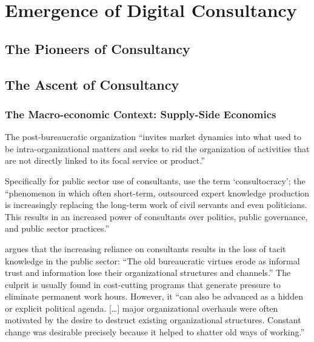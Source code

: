 \documentclass[12pt]{article}
\begin{document}
\hypertarget{emergence-of-digital-consultancy}{%
\section{Emergence of Digital
Consultancy}\label{emergence-of-digital-consultancy}}

\hypertarget{the-pioneers-of-consultancy}{%
\subsection{The Pioneers of
Consultancy}\label{the-pioneers-of-consultancy}}

\hypertarget{the-ascent-of-consultancy}{%
\subsection{The Ascent of Consultancy}\label{the-ascent-of-consultancy}}

\hypertarget{the-macro-economic-context-supply-side-economics}{%
\subsubsection{The Macro-economic Context: Supply-Side
Economics}\label{the-macro-economic-context-supply-side-economics}}

The post-bureaucratic organization ``invites market dynamics into what
used to be intra-organizational matters and seeks to rid the
organization of activities that are not directly linked to its focal
service or product.'' \citep[ 3]{furusten2000}

Specifically for public sector use of consultants,
\citet[242]{ylonen2019} use the term `consultocracy'; the ``phenomenon
in which often short-term, outsourced expert knowledge production is
increasingly replacing the long-term work of civil servants and even
politicians. This results in an increased power of consultants over
politics, public governance, and public sector practices.''

\citet[250]{ylonen2019} argues that the increasing reliance on
consultants results in the loss of tacit knowledge in the public sector:
``The old bureaucratic virtues erode as informal trust and information
lose their organizational structures and channels.'' The culprit is
usually found in cost-cutting programs that generate pressure to
eliminate permanent work hours. However, it ``can also be advanced as a
hidden or explicit political agenda. {[}\ldots{]} major organizational
overhauls were often motivated by the desire to destruct existing
organizational structures. Constant change was desirable precisely
because it helped to shatter old ways of working.''
\end{document}
